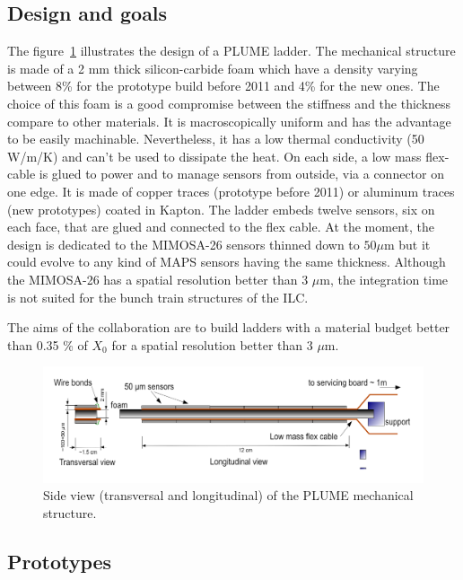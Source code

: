     \subsection{Design and goals}

    The figure~\ref{fig:PLUME} illustrates the design of a PLUME ladder.
    The mechanical structure is made of a 2 mm thick silicon-carbide foam which have a density varying between 8\% for the prototype build before 2011 and 4\% for the new ones.
    The choice of this foam is a good compromise between the stiffness and the thickness compare to other materials. 
    It is macroscopically uniform and has the advantage to be easily machinable.
    Nevertheless, it has a low thermal conductivity (50 W/m/K) and can't be used to dissipate the heat.
    On each side, a low mass flex-cable is glued to power and to manage sensors from outside, via a connector on one edge.
    It is made of copper traces (prototype before 2011) or aluminum traces (new prototypes) coated in Kapton. 
    The ladder embeds twelve sensors, six on each face, that are glued and connected to the flex cable.
    At the moment, the design is dedicated to the MIMOSA-26 sensors thinned down to $50 \mu\text{m}$ but it could evolve to any kind of \gls{MAPS} sensors having the same thickness. 
    Although the MIMOSA-26 has a spatial resolution better than 3 $\mu$m, the integration time is not suited for the bunch train structures of the \gls{ILC}.

    The aims of the collaboration are to build ladders with a material budget better than 0.35 \% of $X_0$ for a spatial resolution better than 3 $\mu$m.

    \begin{figure}[!h]
      \centering
      \includegraphics[width = 15 cm]{Pictures/vxd/plume_finalGoal.png}
      \caption{Side view (transversal and longitudinal) of the PLUME mechanical structure.}
      \label{fig:PLUME}
    \end{figure}

    \subsection{Prototypes}

